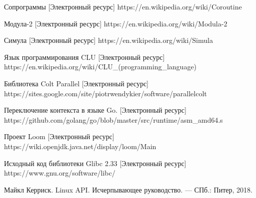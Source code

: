 \begingroup 
\renewcommand{\section}[2]{\anonsection{Библиографический список}}
\begin{thebibliography}{00}

    Сопрограммы
    [Электронный ресурс] 
    https://en.wikipedia.org/wiki/Coroutine

	Модула-2
	[Электронный ресурс] 
	https://en.wikipedia.org/wiki/Modula-2
	
	Симула
	[Электронный ресурс]
	https://en.wikipedia.org/wiki/Simula
	
	Язык программирования CLU
	[Электронный ресурс]
	https://en.wikipedia.org/wiki/CLU\_(programming\_language)
	
	Библиотека Colt Parallel
	[Электронный ресурс]
	https://sites.google.com/site/piotrwendykier/software/parallelcolt
	
	Переключение контекста в языке Go.
	[Электронный ресурс]
	https://github.com/golang/go/blob/master/src/runtime/asm\_amd64.s
	
	Проект Loom
	[Электронный ресурс]
	https://wiki.openjdk.java.net/display/loom/Main
	
	Исходный код библиотеки Glibc 2.33
	[Электронный ресурс] 
	https://www.gnu.org/software/libc/ %

	Майкл Керриск. Linux API. Исчерпывающее руководство. — СПб.: Питер, 2018.

\end{thebibliography}
\endgroup

\clearpage
